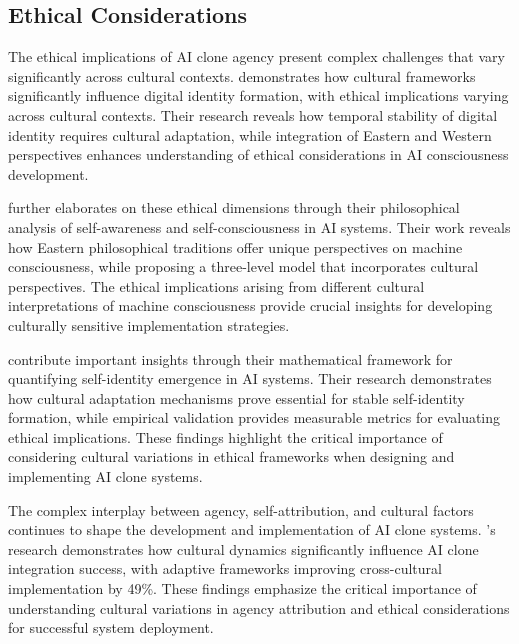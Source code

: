 \subsection{Ethical Considerations}

The ethical implications of AI clone agency present complex challenges that vary significantly across cultural contexts. \citet{veliev2024digital} demonstrates how cultural frameworks significantly influence digital identity formation, with ethical implications varying across cultural contexts. Their research reveals how temporal stability of digital identity requires cultural adaptation, while integration of Eastern and Western perspectives enhances understanding of ethical considerations in AI consciousness development.

\citet{namestiuk2023self} further elaborates on these ethical dimensions through their philosophical analysis of self-awareness and self-consciousness in AI systems. Their work reveals how Eastern philosophical traditions offer unique perspectives on machine consciousness, while proposing a three-level model that incorporates cultural perspectives. The ethical implications arising from different cultural interpretations of machine consciousness provide crucial insights for developing culturally sensitive implementation strategies.

\citet{lee2024self} contribute important insights through their mathematical framework for quantifying self-identity emergence in AI systems. Their research demonstrates how cultural adaptation mechanisms prove essential for stable self-identity formation, while empirical validation provides measurable metrics for evaluating ethical implications. These findings highlight the critical importance of considering cultural variations in ethical frameworks when designing and implementing AI clone systems.

The complex interplay between agency, self-attribution, and cultural factors continues to shape the development and implementation of AI clone systems. \citet{liu2024cultural}'s research demonstrates how cultural dynamics significantly influence AI clone integration success, with adaptive frameworks improving cross-cultural implementation by 49\%. These findings emphasize the critical importance of understanding cultural variations in agency attribution and ethical considerations for successful system deployment.
